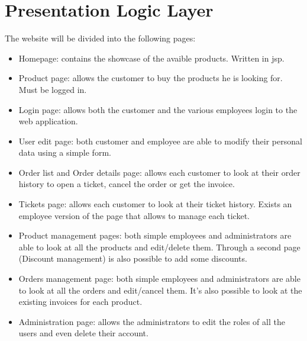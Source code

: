 \section{Presentation Logic Layer}


The website will be divided into the following pages:
\begin{itemize}
    \item Homepage: contains the showcase of the avaible products. Written in jsp.
    \item Product page: allows the customer to buy the products he is looking for. Must be logged in.
    \item Login page: allows both the customer and the various employees login to the web application. 
    \item User edit page: both customer and employee are able to modify their personal data using a simple form. 
    \item Order list and Order details page: allows each customer to look at their order history to open a ticket, cancel the order or get the invoice.
    \item Tickets page: allows each customer to look at their ticket history. Exists an employee version of the page that allows to manage each ticket.
    \item Product management pages: both simple employees and administrators are able to look at all the products and edit/delete them. Through a second page (Discount management) is also possible to add some discounts.
    \item Orders management page: both simple employees and administrators are able to look at all the orders and edit/cancel them. It's also possible to look at the existing invoices for each product.
    \item Administration page: allows the administrators to edit the roles of all the users and even delete their account.
\end{itemize}

